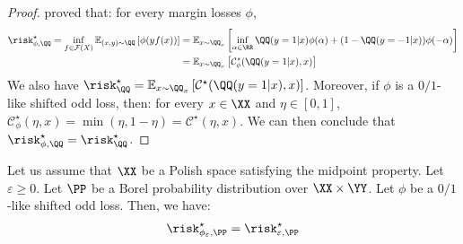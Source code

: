 \begin{proof}
\citet{bartlett2006convexity,steinwart2007compare} proved that: for every margin losses $\phi$,
\begin{align*}
    \risk_{\phi,\QQ}^\star = \inf_{f\in\mathcal{F}(X)}\mathbb{E}_{(x,y)\sim\QQ}\left[\phi(yf(x))\right] &= \mathbb{E}_{x\sim\QQ_x}\left[\inf_{\alpha\in\RR}\QQ(y=1|x)\phi(\alpha)+(1-\QQ(y=-1|x))\phi(-\alpha)\right]\\
    &= \mathbb{E}_{x\sim\QQ_x}\left[\mathcal{C}_\phi^\star(\QQ(y=1|x),x)\right]\\
\end{align*}
We also have $ \risk_{\QQ}^\star =\mathbb{E}_{x\sim\QQ_x}\left[\mathcal{C}^\star(\QQ(y=1|x),x)\right] $. Moreover, if $\phi$ is a $0/1$-like shifted odd loss, then: for every $x\in\XX$ and $\eta\in[0,1]$, $\mathcal{C}_\phi^\star(\eta,x) =\min(\eta,1-\eta)=\mathcal{C}^\star(\eta,x)$. We can then conclude that  $\risk_{\phi,\QQ}^\star =\risk_{\QQ}^\star$.
\end{proof}



\begin{thm*}
Let us assume that $\XX$ be a Polish space satisfying the midpoint property. Let $\varepsilon\geq 0$. Let $\PP$ be a Borel probability distribution over $\XX\times\YY$. Let ${\phi}$ be a $0/1$-like shifted odd loss. Then, we have:
\begin{align*}
    \risk^\star_{{\phi}_\varepsilon,\PP} = \risk^\star_{\varepsilon,\PP}
\end{align*}
\end{thm*}


